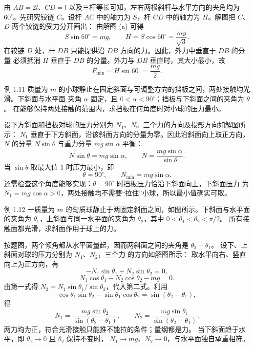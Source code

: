 \begin{xesolution}
由 $AB=2l$、$CD=l$ 以及三杆等长可知，左右两根斜杆与水平方向的夹角均为
$60^\circ$。先研究铰链 $C$。设杆 $AC$ 中的轴力为 $S$，杆 $CD$ 中的轴力为 $H$。解图把
$C$、$D$ 两个铰链的受力分开画出：
\soldiagOneTen
由解图 (a) 可得
\[
  S\sin60^\circ=mg,
  \qquad
  H=S\cos60^\circ=\frac{mg}{\sqrt3}.
\]
在铰链 $D$ 处，杆 $DB$ 只能提供沿 $DB$ 方向的力。因此，外力中垂直于 $DB$ 的分量
必须抵消 $H$ 垂直于 $DB$ 的分量。外力与 $DB$ 垂直时，其大小最小，故
\[
  F_{\min}=H\sin60^\circ=\boxed{\frac{mg}{2}}.
\]
\end{xesolution}

\begin{origexamplebox}{例 1.11}
质量为 $m$ 的小球静止在固定斜面与可调整方向的挡板之间，两处接触均光滑。下斜面与水平面
夹角 $\alpha$ 固定，且 $0<\alpha<90^\circ$；挡板与下斜面之间的夹角为 $\theta$。
在能够保持两处接触的范围内，求挡板在何角度时对小球的压力最小。
\end{origexamplebox}

\Needspace{62mm}
\begin{xesolution}
设下方斜面和挡板对球的压力分别为 $N_1$、$N$。三个力的方向及投影方向如解图所示：
\soldiagOneEleven
$N_1$ 垂直于下方斜面，沿该斜面方向的分量为零。因此沿斜面向上取正方向，
$N$ 的分量 $N\sin\theta$ 与重力分量 $mg\sin\alpha$ 平衡：
\[
  N\sin\theta=mg\sin\alpha,
  \qquad
  N=\frac{mg\sin\alpha}{\sin\theta}.
\]
当 $\sin\theta$ 取最大值 $1$ 时压力最小，即
\[
  \boxed{\theta=90^\circ},
  \qquad
  \boxed{N_{\min}=mg\sin\alpha}.
\]
还需检查这个角度能够实现：$\theta=90^\circ$ 时挡板压力恰沿下斜面向上，下斜面压力
为 $N_1=mg\cos\alpha>0$，两处接触均不需要“拉住”小球，所以最小值确实可取。
\end{xesolution}

\begin{origexamplebox}{例 1.12}
一质量为 $m$ 的匀质球静止于两固定斜面之间，如图所示。下斜面与水平面的夹角为
$\theta_1$，上斜面与同一水平面的夹角为 $\theta_2$，其中 $0<\theta_1<\theta_2<\pi/2$。
所有接触面都光滑，求斜面作用于球上的力。
\end{origexamplebox}

\begin{xesolution}
按题图，两个倾角都从水平面量起，因而两斜面之间的夹角是 $\theta_2-\theta_1$。
设下、上斜面对球的压力分别为 $N_1$、$N_2$，三个力
的方向如解图所示：
\soldiagOneTwelve
取水平向右、竖直向上为正方向，有
\[
  -N_1\sin\theta_1+N_2\sin\theta_2=0,
\]
\[
  N_1\cos\theta_1-N_2\cos\theta_2-mg=0.
\]
由第一式得 $N_2=N_1\sin\theta_1/\sin\theta_2$，代入第二式。利用
\[
 \cos\theta_1\sin\theta_2-\sin\theta_1\cos\theta_2=\sin(\theta_2-\theta_1),
\]
得
\[
  \boxed{N_1=\frac{mg\sin\theta_2}{\sin(\theta_2-\theta_1)}},
  \qquad
  \boxed{N_2=\frac{mg\sin\theta_1}{\sin(\theta_2-\theta_1)}}.
\]
两力均为正，符合光滑接触只能推不能拉的条件；量纲都是力。
当下斜面趋于水平，即 $\theta_1\to0$ 且 $\theta_2$ 保持不变时，
$N_1\to mg$、$N_2\to0$，与水平面独自承重相符。
\end{xesolution}

